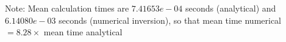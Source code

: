 Note: Mean calculation times are $7.41653e-04$ seconds (analytical) and $6.14080e-03$ seconds (numerical inversion), so that mean time numerical $=  8.28\times$ mean time analytical
